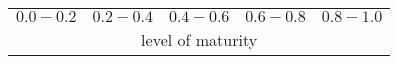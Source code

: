 \documentclass{article}
\begin{document}
\begin{tabular}{ccccc}
     \cellcolor{red!35} $0.0-0.2$ &
     \cellcolor{orange!35} $0.2- 0.4$ &
     \cellcolor{yellow!35} $0.4-0.6$ &
     \cellcolor{LimeGreen!35} $0.6-0.8$ &
     \cellcolor{ForestGreen!35} $0.8-1.0$ \\
     \multicolumn{5}{c}{level of maturity}
\end{tabular}
\end{document}
